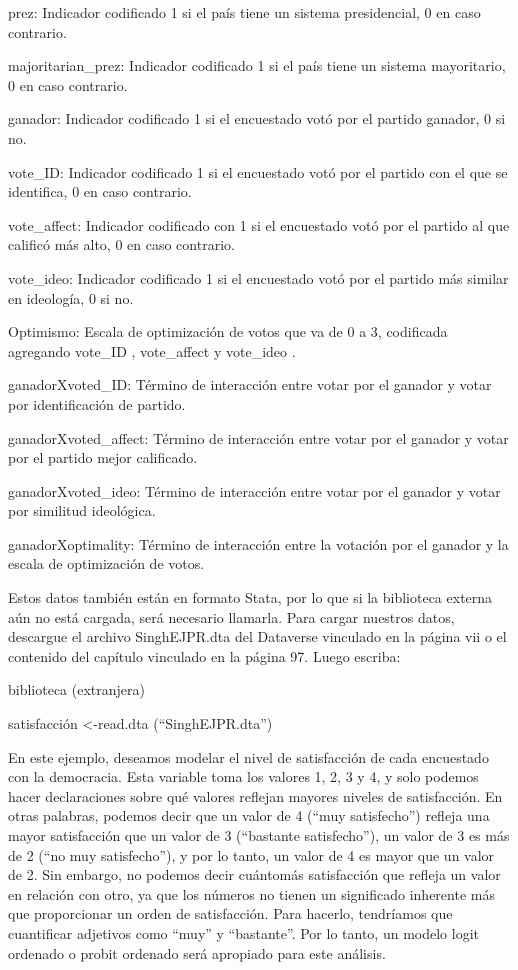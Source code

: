 \documentclass[
]{book}
\begin{document}
prez:
Indicador codificado 1 si el país tiene un sistema presidencial, 0 en caso contrario.

majoritarian\_prez:
Indicador codificado 1 si el país tiene un sistema mayoritario, 0 en caso contrario.

ganador:
Indicador codificado 1 si el encuestado votó por el partido ganador, 0 si no.

vote\_ID:
Indicador codificado 1 si el encuestado votó por el partido con el que se identifica, 0 en caso contrario.

vote\_affect:
Indicador codificado con 1 si el encuestado votó por el partido al que calificó más alto, 0 en caso contrario.

vote\_ideo:
Indicador codificado 1 si el encuestado votó por el partido más similar en ideología, 0 si no.

Optimismo:
Escala de optimización de votos que va de 0 a 3, codificada agregando vote\_ID , vote\_affect y vote\_ideo .

ganadorXvoted\_ID:
Término de interacción entre votar por el ganador y votar por identificación de partido.

ganadorXvoted\_affect:
Término de interacción entre votar por el ganador y votar por el partido mejor calificado.

ganadorXvoted\_ideo:
Término de interacción entre votar por el ganador y votar por similitud ideológica.

ganadorXoptimality:
Término de interacción entre la votación por el ganador y la escala de optimización de votos.

Estos datos también están en formato Stata, por lo que si la biblioteca externa aún no está cargada, será necesario llamarla. Para cargar nuestros datos, descargue el archivo SinghEJPR.dta del Dataverse vinculado en la página vii o el contenido del capítulo vinculado en la página 97. Luego escriba:

biblioteca (extranjera)

satisfacción \textless-read.dta (``SinghEJPR.dta'')

En este ejemplo, deseamos modelar el nivel de satisfacción de cada encuestado con la democracia. Esta variable toma los valores 1, 2, 3 y 4, y solo podemos hacer declaraciones sobre qué valores reflejan mayores niveles de satisfacción. En otras palabras, podemos decir que un valor de 4 (``muy satisfecho'') refleja una mayor satisfacción que un valor de 3 (``bastante satisfecho''), un valor de 3 es más de 2 (``no muy satisfecho''), y por lo tanto, un valor de 4 es mayor que un valor de 2. Sin embargo, no podemos decir cuántomás satisfacción que refleja un valor en relación con otro, ya que los números no tienen un significado inherente más que proporcionar un orden de satisfacción. Para hacerlo, tendríamos que cuantificar adjetivos como ``muy'' y ``bastante''. Por lo tanto, un modelo logit ordenado o probit ordenado será apropiado para este análisis.
\end{document}
